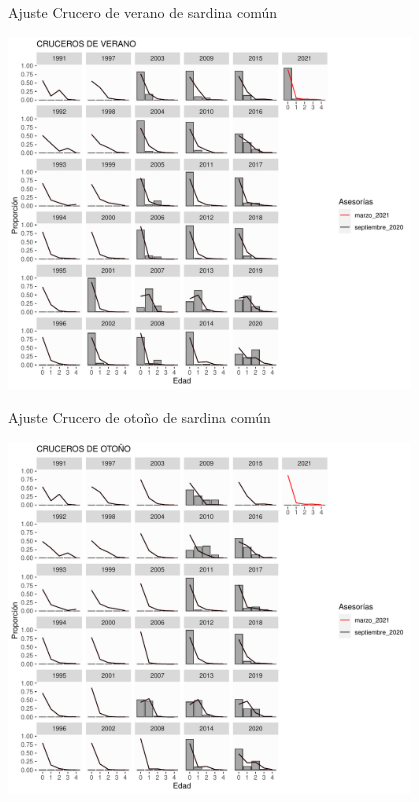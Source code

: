 \documentclass[
  ignorenonframetext,
]{beamer}
\begin{document}
\begin{frame}{Ajuste Crucero de verano de sardina común}
\protect\hypertarget{ajuste-crucero-de-verano-de-sardina-comuxfan}{}
\begin{center}

\includegraphics[width=0.8\textwidth]{FigurasInforme_Marzo/Fig29_ajustesCompR-1.pdf}

\end{center}
\end{frame}

\begin{frame}{Ajuste Crucero de otoño de sardina común}
\protect\hypertarget{ajuste-crucero-de-otouxf1o-de-sardina-comuxfan}{}
\begin{center}

\includegraphics[width=0.8\textwidth]{FigurasInforme_Marzo/Fig30_AjustesCompP-1.pdf}

\end{center}
\end{frame}
\end{document}
